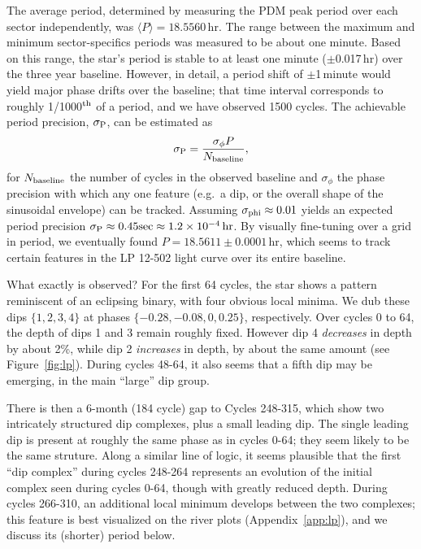 \documentclass[11pt,twocolumn,tighten]{aastex63}
\begin{document}
The average period, determined by measuring the PDM peak period over
each sector independently, was $\langle P \rangle = 18.5560$\,hr.  The
range between the maximum and minimum sector-specifics periods was
measured to be about one minute.  Based on this range, the star's
period is stable to at least one minute ($\pm$0.017\,hr) over the
three year baseline.  However, in detail, a period shift of
$\pm$1\,minute would yield major phase drifts over the baseline; that
time interval corresponds to roughly 1/1000$^{\rm th}$ of a period,
and we have observed 1500 cycles.  The achievable period precision,
$\sigma_{\rm P}$, can be estimated as
\begin{equation}
  \sigma_{\rm P} = \frac { \sigma_{\rm \phi} P } { N_{\rm baseline} },
\end{equation}
for $N_{\rm baseline}$ the number of cycles in the observed baseline
and $\sigma_{\phi}$ the phase precision with which any one feature
(e.g.~a dip, or the overall shape of the sinusoidal envelope) can be
tracked.  Assuming $\sigma_{\rm phi} \approx 0.01$ yields an expected
period precision $\sigma_{\rm P} \approx 0.45 {\rm sec} \approx
1.2\times 10^{-4}\,{\rm hr}$.  By visually fine-tuning over a grid in
period, we eventually found $P=18.5611 \pm 0.0001$\,hr, which seems to
track certain features in the LP 12-502 light curve over its entire
baseline.

What exactly is observed?  For the first 64 cycles, the star shows a
pattern reminiscent of an eclipsing binary, with four obvious
local minima.  We dub these dips $\{ 1, 2, 3, 4 \}$ at phases $\{ -0.28,
-0.08, 0, 0.25 \}$, respectively.  Over cycles 0 to 64, the depth of
dips 1 and 3 remain roughly fixed.  However dip 4 {\it decreases} in
depth by about 2\%, while dip 2 {\it increases} in depth, by about the
same amount (see Figure~\ref{fig:lp}).  During cycles 48-64, it also
seems that a fifth dip may be emerging, in the main ``large'' dip
group.

There is then a 6-month (184 cycle) gap to Cycles 248-315, which
show two intricately structured dip complexes, plus a small leading
dip.  The single leading dip is present at roughly the same phase as
in cycles 0-64; they seem likely to be the same struture.  Along a
similar line of logic, it seems plausible that the first ``dip
complex'' during cycles 248-264 represents an evolution of the initial
complex seen during cycles 0-64, though with greatly reduced depth.
During cycles 266-310, an additional local minimum develops between the two
complexes; this feature is best visualized on the river plots
(Appendix~\ref{app:lp}), and we discuss its (shorter) period below.
\end{document}
